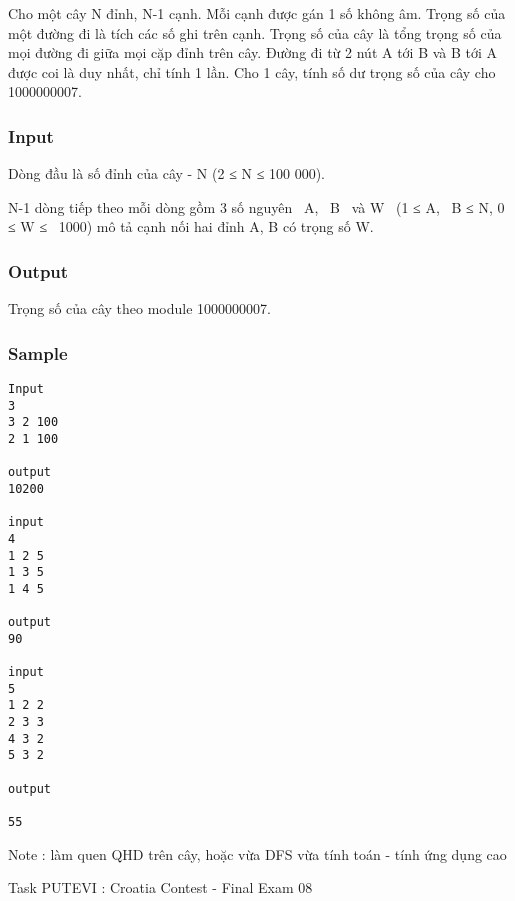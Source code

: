 

Cho một cây N đỉnh, N-1 cạnh. Mỗi cạnh được gán 1 số không âm. Trọng số của một đường đi là tích các số ghi trên cạnh. Trọng số của cây là tổng trọng số của mọi đường đi giữa mọi cặp đỉnh trên cây. Đường đi từ 2 nút A tới B và B tới A được coi là duy nhất, chỉ tính 1 lần. Cho 1 cây, tính số dư trọng số của cây cho 1000000007.

\subsubsection{Input}

Dòng đầu là số đỉnh của cây - N (2 ≤ N ≤ 100 000).

N-1 dòng tiếp theo mỗi dòng gồm 3 số nguyên  A,  B  và W  (1 ≤ A,  B ≤ N, 0 ≤ W ≤  1000) mô tả cạnh nối hai đỉnh A, B có trọng số W.

\subsubsection{Output}

Trọng số của cây theo module 1000000007. 

\subsubsection{Sample}
\begin{verbatim}
Input 
3 
3 2 100 
2 1 100 
 
output 
10200 

input 
4 
1 2 5 
1 3 5 
1 4 5 

output 
90 

input 
5 
1 2 2 
2 3 3 
4 3 2 
5 3 2 
 
output 
 
55
\end{verbatim}

Note : làm quen QHD trên cây, hoặc vừa DFS vừa tính toán - tính ứng dụng cao


Task PUTEVI : Croatia Contest - Final Exam 08
